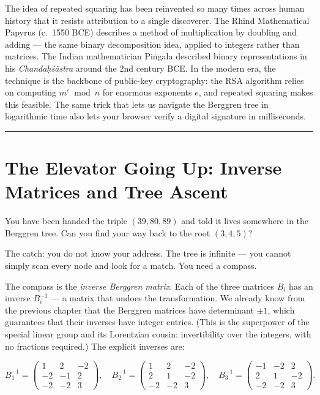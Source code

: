 The idea of repeated squaring has been reinvented so many times across human history that it resists attribution to a single discoverer. The Rhind Mathematical Papyrus (c.~1550 BCE) describes a method of multiplication by doubling and adding --- the same binary decomposition idea, applied to integers rather than matrices. The Indian mathematician Piṅgala described binary representations in his \emph{Chandaḥśāstra} around the 2nd century BCE. In the modern era, the technique is the backbone of public-key cryptography: the RSA algorithm relies on computing \(m^e \bmod n\) for enormous exponents \(e\), and repeated squaring makes this feasible. The same trick that lets us navigate the Berggren tree in logarithmic time also lets your browser verify a digital signature in milliseconds.

\bigskip\noindent\rule{\linewidth}{0.4pt}\bigskip

\section{The Elevator Going Up: Inverse Matrices and Tree Ascent}
You have been handed the triple \((39, 80, 89)\) and told it lives somewhere in the Berggren tree. Can you find your way back to the root \((3, 4, 5)\)?

The catch: you do not know your address. The tree is infinite --- you cannot simply scan every node and look for a match. You need a compass.

The compass is the \emph{inverse Berggren matrix}. Each of the three matrices \(B_i\) has an inverse \(B_i^{-1}\) --- a matrix that undoes the transformation. We already know from the previous chapter that the Berggren matrices have determinant \(\pm 1\), which guarantees that their inverses have integer entries. (This is the superpower of the special linear group and its Lorentzian cousin: invertibility over the integers, with no fractions required.) The explicit inverses are:

\[B_1^{-1} = \begin{pmatrix} 1 & 2 & -2 \\ -2 & -1 & 2 \\ -2 & -2 & 3 \end{pmatrix}, \quad B_2^{-1} = \begin{pmatrix} 1 & 2 & -2 \\ 2 & 1 & -2 \\ -2 & -2 & 3 \end{pmatrix}, \quad B_3^{-1} = \begin{pmatrix} -1 & -2 & 2 \\ 2 & 1 & -2 \\ -2 & -2 & 3 \end{pmatrix}.\]

